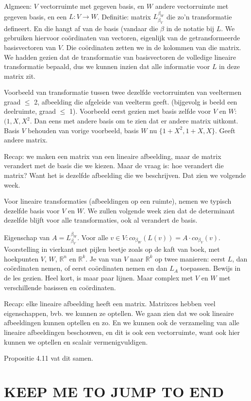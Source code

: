 \documentclass{article}
\begin{document}
Algmeen: $V$ vectorruimte met gegeven basis, en $W$ andere vectorruimte met gegeven basis, en een $L: V \to W$. Definitie: matrix $L_{\beta_V}^{\beta_W}$ die zo'n transformatie defineert. En die hangt af van de basis (vandaar die $\beta$ in de notatie bij $L$.  
We gebruiken hiervoor co\"ordinaten van vectoren, eigenlijk van de getransformeerde basisvectoren van $V$. Die co\"ordinaten zetten we in de kolommen van die matrix. We hadden gezien dat de transformatie van basisvectoren de volledige lineaire transformatie bepaald, dus we kunnen inzien dat alle informatie voor $L$ in deze matrix zit. 

Voorbeeld van transformatie tussen twee dezelfde vectorruimten van veeltermen graad $\leq$ 2, afbeelding die afgeleide van veelterm geeft. (bijgevolg is beeld een deelruimte, graad $\leq$ 1). Voorbeeld eerst gezien met basis zelfde voor $V$ en $W$:  $(1,X,X^2$. Dan eens met andere basis om te zien dat er andere matrix uitkomt. Basis $V$ behouden van vorige voorbeeld, basis $W$ nu $\{ 1+X^2, 1+X, X \}$. Geeft andere matrix. 

Recap: we maken een matrix van een lineaire afbeelding, maar de matrix verandert met de basis die we kiezen. Maar de vraag is: hoe verandert die matrix? Want het is dezelfde afbeelding die we beschrijven. Dat zien we volgende week. 

Voor lineaire transformaties (afbeeldingen op een ruimte), nemen we typisch dezelfde basis voor $V$ en $W$. We zullen volgende week zien dat de determinant dezelfde blijft voor alle transformaties, ook al verandert de basis. 

Eigenschap van $A = L_{\beta_V}^{\beta_W}$. Voor alle $v \in V: co_{\beta_W}(L(v)) = A \cdot co_{\beta_V}(v)$. Voorstelling in vierkant met pijlen beetje zoals op de kaft van boek, met hoekpunten $V$, $W$, $\mathbb{R}^n$ en $\mathbb{R}^k$. Je van van $V$ naar $\mathbb{R}^k$ op twee manieren: eerst $L$, dan co\"ordinaten nemen, of eerst co\"ordinaten nemen en dan $L_A$ toepassen. 
Bewijs in de les gezien. Heel kort, is maar paar lijnen. Maar complex met $V$ en $W$ met verschillende basissen en co\"ordinaten. 

Recap: 
elke lineaire afbeelding heeft een matrix. Matrixces hebben veel eigenschappen, bvb. we kunnen ze optellen. We gaan zien dat we ook lineaire afbeeldingen kunnen optellen en zo. En we kunnen ook de verzameling van alle lineaire afbeeldingen beschouwen, en dit is ook een vectorruimte, want ook hier kunnen we optellen en scalair vermenigvuldigen. 

Propositie 4.11 vat dit samen. 

\section{KEEP ME TO JUMP TO END}
\end{document}
